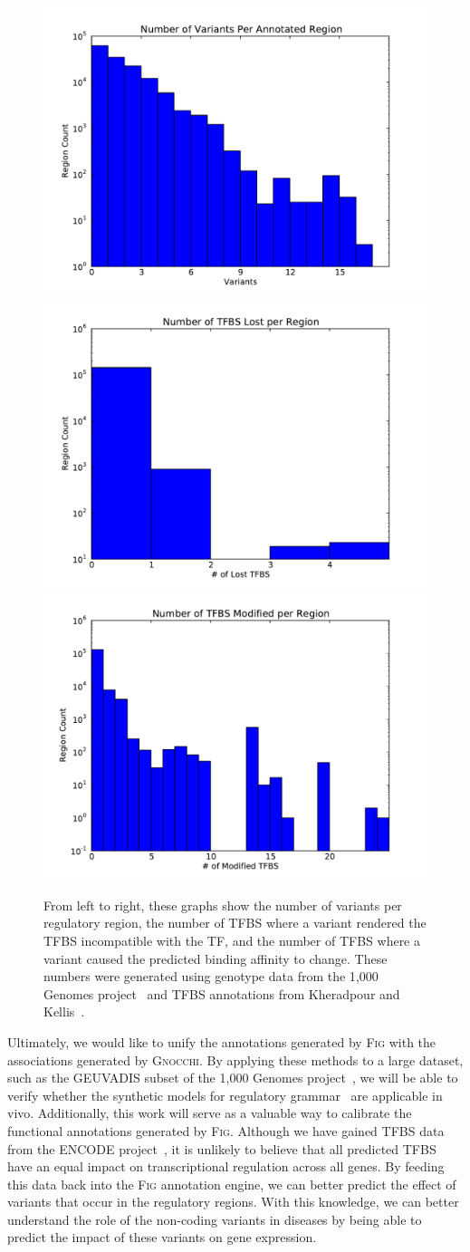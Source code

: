 \documentclass[11pt]{article} %
\begin{document}
\begin{figure}[h]
\begin{center}
\includegraphics[width=0.25\linewidth]{../fig/cmpbio290/graphs/variants.pdf}
\includegraphics[width=0.25\linewidth]{../fig/cmpbio290/graphs/lost-sites.pdf}
\includegraphics[width=0.25\linewidth]{../fig/cmpbio290/graphs/mod-sites.pdf}
\caption{From left to right, these graphs show the number of variants per regulatory region,
the number of TFBS where a variant rendered the TFBS incompatible with the TF, and the number
of TFBS where a variant caused the predicted binding affinity to change. These numbers were
generated using genotype data from the 1,000 Genomes project~\cite{siva08} and TFBS annotations
from Kheradpour and Kellis~\cite{kheradpour14}.}
\label{fig:sites}
\end{center}
\end{figure}

Ultimately, we would like to unify the annotations generated by \textsc{Fig} with the associations
generated by \textsc{Gnocchi}. By applying these methods to a large dataset, such as the
GEUVADIS subset of the 1,000 Genomes project~\cite{lappalainen13}, we will be able to verify
whether the synthetic models for regulatory grammar~\cite{levo14, sharon12, weingarten14}
are applicable in vivo. Additionally, this work will serve as a valuable way to calibrate the
functional annotations generated by \textsc{Fig}. Although we have gained TFBS data from the
ENCODE project~\cite{gerstein12, kheradpour14}, it is unlikely to believe that all predicted
TFBS have an equal impact on transcriptional regulation across all genes. By feeding this data
back into the \textsc{Fig} annotation engine, we can better predict the effect of variants
that occur in the regulatory regions. With this knowledge, we can better understand the role
of the non-coding variants in diseases by being able to predict the impact of these variants
on gene expression.



\end{document}
